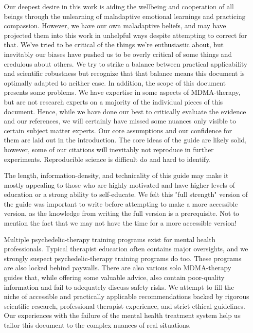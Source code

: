 \documentclass[12pt,letterpaper]{book}
\begin{document}
Our deepest desire in this work is aiding the wellbeing and cooperation of all beings through the unlearning of maladaptive emotional learnings and practicing compassion. However, we have our own maladaptive beliefs, and may have projected them into this work in unhelpful ways despite attempting to correct for that. We’ve tried to be critical of the things we’re enthusiastic about, but inevitably our biases have pushed us to be overly critical of some things and credulous about others. We try to strike a balance between practical applicability and scientific robustness but recognize that that balance means this document is optimally adapted to neither case. In addition, the scope of this document presents some problems. We have expertise in some aspects of MDMA-therapy, but are not research experts on a majority of the individual pieces of this document. Hence, while we have done our best to critically evaluate the evidence and our references, we will certainly have missed some nuances only visible to certain subject matter experts. Our core assumptions and our confidence for them are laid out in the introduction. The core ideas of the guide are likely solid, however, some of our citations will inevitably not reproduce in further experiments. Reproducible science is difficult do and hard to identify.

The length, information-density, and technicality of this guide may make it mostly appealing to those who are highly motivated and have higher levels of education or a strong ability to self-educate. We felt this "full strength" version of the guide was important to write before attempting to make a more accessible version, as the knowledge from writing the full version is a prerequisite. Not to mention the fact that we may not have the time for a more accessible version!

Multiple psychedelic-therapy training programs exist for mental health professionals. Typical therapist education often contains major oversights, and we strongly suspect psychedelic-therapy training programs do too. These programs are also locked behind paywalls. There are also various solo MDMA-therapy guides that, while offering some valuable advice, also contain poor-quality information and fail to adequately discuss safety risks. We attempt to fill the niche of accessible and practically applicable recommendations backed by rigorous scientific research, professional therapist experience, and strict ethical guidelines. Our experiences with the failure of the mental health treatment system help us tailor this document to the complex nuances of real situations.
\end{document}
